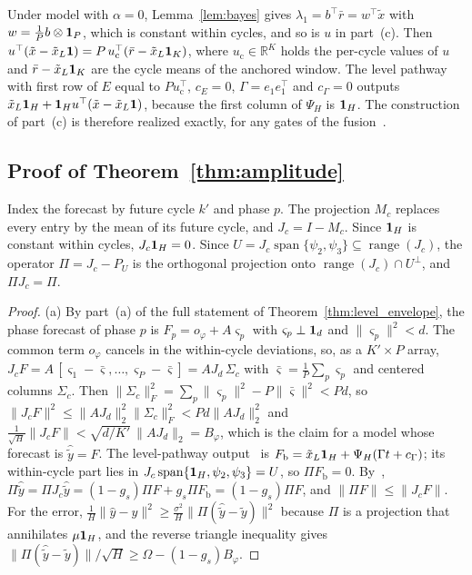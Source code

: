{
Under model  with $\alpha=0$, Lemma~\ref{lem:bayes} gives $\lambda_1=b^\top\bar r=w^\top\tilde x$ with $w=\tfrac1Pb\otimes\mathbf 1_P$, which is constant within cycles, and so is $u$ in part~(c). Then $u^\top(\tilde x-\tilde x_L\mathbf 1)=P\,u_{\mathrm c}^\top(\bar r-\tilde x_L\mathbf 1_K)$, where $u_{\mathrm c}\in\mathbb R^K$ holds the per-cycle values of $u$ and $\bar r-\tilde x_L\mathbf 1_K$ are the cycle means of the anchored window. The level pathway~ with first row of $E$ equal to $Pu_{\mathrm c}^\top$, $c_E=0$, $\Gamma=e_1e_1^\top$ and $c_\Gamma=0$ outputs $\tilde x_L\mathbf 1_H+\mathbf 1_Hu^\top(\tilde x-\tilde x_L\mathbf 1)$, because the first column of $\Psi_H$ is $\mathbf 1_H$. The construction of part~(c) is therefore realized exactly, for any gates of the fusion~.

\subsection{Proof of Theorem~\ref{thm:amplitude}}

Index the forecast by future cycle $k'$ and phase $p$. The projection $M_c$ replaces every entry by the mean of its future cycle, and $J_c=I-M_c$. Since $\mathbf 1_H$ is constant within cycles, $J_c\mathbf 1_H=0$. Since $U=J_c\operatorname{span}\{\psi_2,\psi_3\}\subseteq\operatorname{range}(J_c)$, the operator $\Pi=J_c-P_U$ is the orthogonal projection onto $\operatorname{range}(J_c)\cap U^\perp$, and $\Pi J_c=\Pi$.

\begin{proof}
(a) By part~(a) of the full statement of Theorem~\ref{thm:level_envelope}, the phase forecast of phase $p$ is $F_p=o_\varphi+A\varsigma_p$ with $\varsigma_p\perp\mathbf 1_d$ and $\|\varsigma_p\|^2<d$. The common term $o_\varphi$ cancels in the within-cycle deviations, so, as a $K'\times P$ array, $J_cF=A\,[\varsigma_1-\bar\varsigma,\dots,\varsigma_P-\bar\varsigma]=AJ_d\,\Sigma_c$ with $\bar\varsigma=\tfrac1P\sum_p\varsigma_p$ and centered columns $\Sigma_c$. Then $\|\Sigma_c\|_F^2=\sum_p\|\varsigma_p\|^2-P\|\bar\varsigma\|^2<Pd$, so $\|J_cF\|^2\le\|AJ_d\|_2^2\|\Sigma_c\|_F^2<Pd\|AJ_d\|_2^2$ and $\tfrac1{\sqrt H}\|J_cF\|<\sqrt{d/K'}\,\|AJ_d\|_2=B_\varphi$, which is the claim for a model whose forecast is $\hat{\tilde y}=F$. The level-pathway output~ is $F_{\mathrm b}=\tilde x_L\mathbf 1_H+\Psi_H(\Gamma t+c_\Gamma)$; its within-cycle part lies in $J_c\operatorname{span}\{\mathbf 1_H,\psi_2,\psi_3\}=U$, so $\Pi F_{\mathrm b}=0$. By~, $\Pi\hat{\tilde y}=\Pi J_c\hat{\tilde y}=(1-g_s)\Pi F+g_s\Pi F_{\mathrm b}=(1-g_s)\Pi F$, and $\|\Pi F\|\le\|J_cF\|$. For the error, $\tfrac1H\|\hat y-y\|^2\ge\tfrac{\sigma^2}{H}\|\Pi(\hat{\tilde y}-\tilde y)\|^2$ because $\Pi$ is a projection that annihilates $\mu\mathbf 1_H$, and the reverse triangle inequality gives $\|\Pi(\hat{\tilde y}-\tilde y)\|/\sqrt H\ge\Omega-(1-g_s)B_\varphi$.


\end{proof}}
